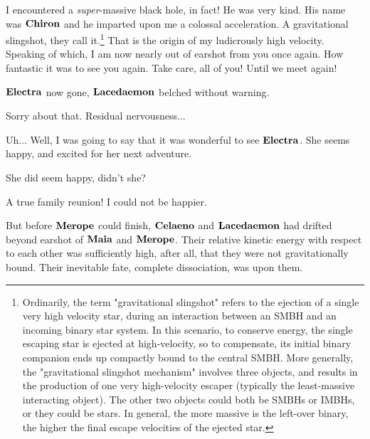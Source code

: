 \documentclass[main.tex]{subfiles}
\begin{document}
\par \Electra I encountered a \textit{super}-massive black hole, in fact!  He was very kind.  His name was $\Chiron$ and he imparted upon me a colossal acceleration.  A gravitational slingshot, they call it.\footnote{Ordinarily, the term "gravitational slingshot" refers to the ejection of a single very high velocity star, during an interaction between an SMBH and an incoming binary star system. In this scenario, to conserve energy, the single escaping star is ejected at high-velocity, so to compensate, its initial binary companion ends up compactly bound to the central SMBH.   More generally, the "gravitational slingshot mechanism" involves three objects, and results in the production of one very high-velocity escaper (typically the least-massive interacting object).  The other two objects could both be SMBHs or IMBHs, or they could be stars.  In general, the more massive is the left-over binary, the higher the final escape velocities of the ejected star.}  That is the origin of my ludicrously high velocity.  Speaking of which, I am now nearly out of earshot from you once again.  How fantastic it was to see you again.  Take care, all of you!  Until we meet again! 


\par \nar $\Electra$ now gone, $\Lacedaemon$ belched without warning.

\par \Lacedaemon Sorry about that.  Residual nervousness...

\par \Celaeno Uh... Well, I was going to say that it was wonderful to see $\Electra$.  She seems happy, and excited for her next adventure.

\par \Maia She did seem happy, didn't she?  

\par \Merope A true family reunion!  I could not be happier.

\par \nar But before $\Merope$ could finish, $\Celaeno$ and $\Lacedaemon$ had drifted beyond earshot of $\Maia$ and $\Merope$.  Their relative kinetic energy with respect to each other was sufficiently high, after all, that they were not gravitationally bound.%
Their inevitable fate, complete dissociation, was upon them.
\end{document}
